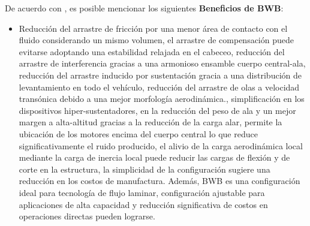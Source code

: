 De acuerdo con \cite{CHEN2019}, es posible mencionar los siguientes \textbf{Beneficios de BWB}:
\begin{itemize}
    \item Reducción del arrastre de fricción por una menor área de contacto con el fluido considerando un mismo volumen, el arrastre de compensación puede evitarse adoptando una estabilidad relajada en el cabeceo, reducción del arrastre de interferencia gracias a una armonioso ensamble cuerpo central-ala, reducción del arrastre inducido por sustentación gracia a una distribución de levantamiento en todo el vehículo, reducción del arrastre de olas a velocidad transónica debido a una mejor morfología aerodinámica., simplificación en los dispositivos hiper-sustentadores, en la reducción del peso de ala y un mejor margen a alta-altitud gracias a la reducción de la carga alar, permite la ubicación de los motores encima del cuerpo central lo que reduce significativamente el ruido producido, el alivio de la carga aerodinámica local mediante la carga de inercia local puede reducir las cargas de flexión y de corte en la estructura, la simplicidad de la configuración sugiere una reducción en los costos de manufactura. Además, BWB es una configuración ideal para tecnología de flujo laminar, configuración ajustable para aplicaciones de alta capacidad y reducción significativa de costos en operaciones directas pueden lograrse.
\end{itemize}
